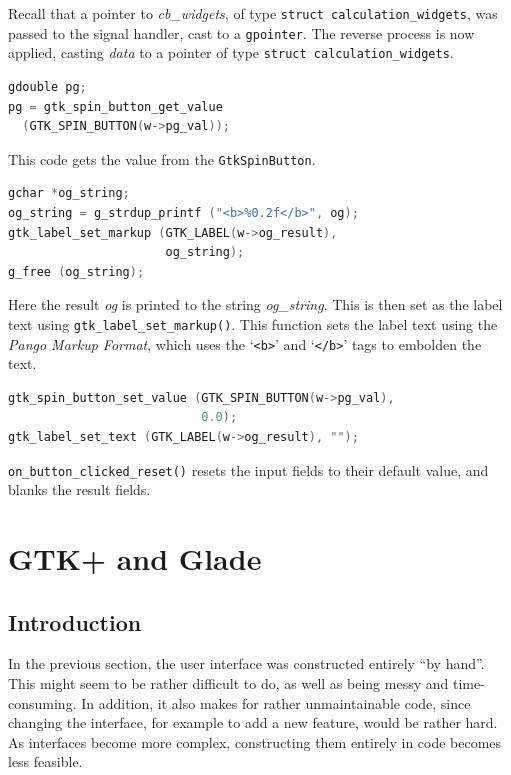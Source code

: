\documentclass[a4paper,oneside]{article}
\newcommand{\variable}[1]{\textsl{#1}}
\newcommand{\class}[1]{\texttt{#1}}
\newcommand{\function}[1]{\texttt{#1()}}
\newcommand{\type}[1]{\texttt{#1}}
\newcommand{\code}[1]{\texttt{#1}}
\begin{document}
Recall that a pointer to \variable{cb\_widgets}, of type \type{struct
  calculation\_widgets}, was passed to the signal handler, cast to a
\type{gpointer}.  The reverse process is now applied, casting
\variable{data} to a pointer of type \type{struct
  calculation\_widgets}.

\begin{lstlisting}[numbers=none, language=C]
gdouble pg;
pg = gtk_spin_button_get_value
  (GTK_SPIN_BUTTON(w->pg_val));
\end{lstlisting}

This code gets the value from the \class{GtkSpinButton}.

\begin{lstlisting}[numbers=none, language=C]
gchar *og_string;
og_string = g_strdup_printf ("<b>%0.2f</b>", og);
gtk_label_set_markup (GTK_LABEL(w->og_result),
                      og_string);
g_free (og_string);
\end{lstlisting}

Here the result \variable{og} is printed to the string
\variable{og\_string}.  This is then set as the label text using
\function{gtk\_label\_set\_markup}.  This function sets the label text
using the \emph{Pango Markup Format}, which uses the `\code{<b>}' and
`\code{</b>}' tags to embolden the text.

\begin{lstlisting}[numbers=none, language=C]
gtk_spin_button_set_value (GTK_SPIN_BUTTON(w->pg_val),
                           0.0);
gtk_label_set_text (GTK_LABEL(w->og_result), "");
\end{lstlisting}

\function{on\_button\_clicked\_reset} resets the input fields to their
default value, and blanks the result fields.



\section{GTK+ and Glade}

\label{sec:glade}

\subsection{Introduction}

In the previous section, the user interface was constructed entirely
``by hand''.  This might seem to be rather difficult to do, as well as
being messy and time-consuming.  In addition, it also makes for rather
unmaintainable code, since changing the interface, for example to add
a new feature, would be rather hard.  As interfaces become more
complex, constructing them entirely in code becomes less feasible.
\end{document}
